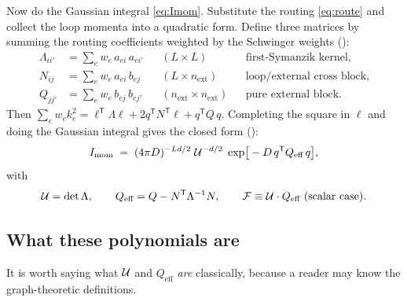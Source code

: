 Now do the Gaussian integral \eqref{eq:Imom}. Substitute the routing
\eqref{eq:route} and collect the loop momenta into a quadratic form. Define three
matrices by summing the routing coefficients weighted by the Schwinger weights
():
\begin{align}
  \Lambda_{ii'} &= \sum_e w_e\,a_{ei}\,a_{ei'} &&(L\times L) &&\text{first-Symanzik kernel,}\\
  N_{ij} &= \sum_e w_e\,a_{ei}\,b_{ej} &&(L\times n_{\text{ext}}) &&\text{loop/external cross block,}\\
  Q_{jj'} &= \sum_e w_e\,b_{ej}\,b_{ej'} &&(n_{\text{ext}}\times n_{\text{ext}}) &&\text{pure external block.}
\end{align}
Then $\sum_e w_e k_e^2 = \ell^{\mathsf T}\Lambda\ell + 2q^{\mathsf T}N^{\mathsf T}\ell
+ q^{\mathsf T}Q\,q$. Completing the square in $\ell$ and doing the Gaussian
integral gives the closed form ():
\begin{equation}
  I_{\text{mom}} \;=\; (4\pi D)^{-Ld/2}\;\mathcal{U}^{-d/2}\;
     \exp\!\big[-D\,q^{\mathsf T} Q_{\text{eff}}\, q\big],
  \label{eq:collapse}
\end{equation}
with
\begin{equation}
  \mathcal{U} = \det\Lambda,
  \qquad
  Q_{\text{eff}} = Q - N^{\mathsf T}\Lambda^{-1}N,
  \qquad
  \mathcal{F} \equiv \mathcal{U}\cdot Q_{\text{eff}}\ \text{(scalar case)}.
  \label{eq:UF}
\end{equation}

\subsection{What these polynomials are}

It is worth saying what $\mathcal{U}$ and $Q_{\text{eff}}$ \emph{are} classically,
because a reader may know the graph-theoretic definitions.

